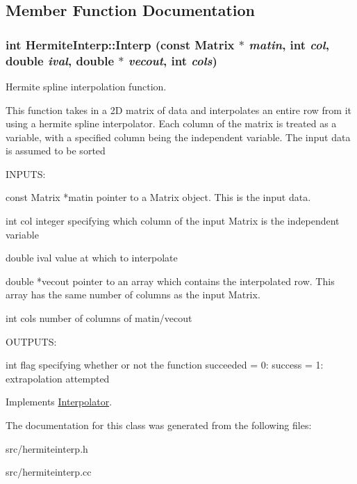 \subsection{Member Function Documentation}
\hypertarget{classHermiteInterp_a3de30c92f2e22b207a32b221d4a09ff9}{
\subsubsection[{Interp}]{\setlength{\rightskip}{0pt plus 5cm}int HermiteInterp::Interp (const {\bf Matrix} $\ast$ {\em matin}, \/  int {\em col}, \/  double {\em ival}, \/  double $\ast$ {\em vecout}, \/  int {\em cols})}}
\label{dd/d1b/classHermiteInterp_a3de30c92f2e22b207a32b221d4a09ff9}


Hermite spline interpolation function. 

This function takes in a 2D matrix of data and interpolates an entire row from it using a hermite spline interpolator. Each column of the matrix is treated as a variable, with a specified column being the independent variable. The input data is assumed to be sorted

\begin{DoxyVerb}
  INPUTS:

  const Matrix *matin    pointer to a Matrix object. This is the input data.

  int col                integer specifying which column of the input Matrix is the independent
                         variable

  double ival            value at which to interpolate

  double *vecout         pointer to an array which contains the interpolated row. This array has
                         the same number of columns as the input Matrix.

  int cols               number of columns of matin/vecout


  OUTPUTS:

  int                    flag specifying whether or not the function succeeded
                         = 0: success
			 = 1: extrapolation attempted

\end{DoxyVerb}
 

Implements \hyperlink{classInterpolator_a2238defccb009047f624bda33cc47c73}{Interpolator}.



The documentation for this class was generated from the following files:\begin{DoxyCompactItemize}
\item 
src/hermiteinterp.h\item 
src/hermiteinterp.cc\end{DoxyCompactItemize}
